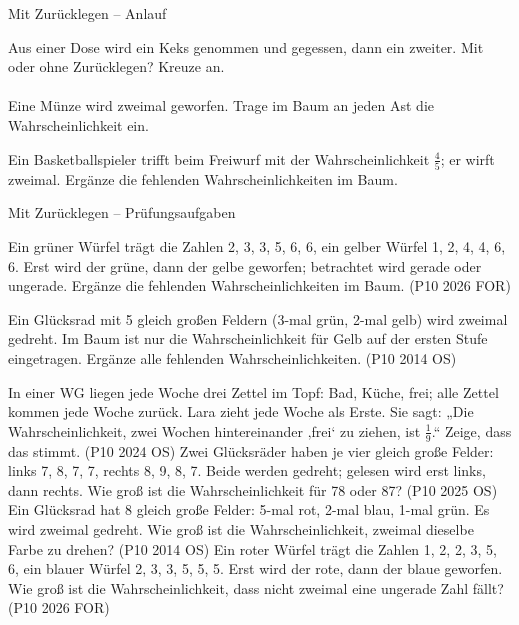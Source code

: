 \begin{aufgabe}{Mit Zurücklegen – Anlauf}
\begin{teile}
\teil Aus einer Dose wird ein Keks genommen und gegessen, dann ein zweiter. Mit oder ohne Zurücklegen? Kreuze an. \\  \\ 
\teil Eine Münze wird zweimal geworfen. Trage im Baum an jeden Ast die Wahrscheinlichkeit ein.

\teil Ein Basketballspieler trifft beim Freiwurf mit der Wahrscheinlichkeit $\frac{4}{5}$; er wirft zweimal. Ergänze die fehlenden Wahrscheinlichkeiten im Baum.

\end{teile}
\end{aufgabe}

\begin{aufgabe}{Mit Zurücklegen – Prüfungsaufgaben}
\begin{teile}
\teil Ein grüner Würfel trägt die Zahlen 2, 3, 3, 5, 6, 6, ein gelber Würfel 1, 2, 4, 4, 6, 6. Erst wird der grüne, dann der gelbe geworfen; betrachtet wird gerade oder ungerade. Ergänze die fehlenden Wahrscheinlichkeiten im Baum. \hfill (P10 2026 FOR)

\teil Ein Glücksrad mit 5 gleich großen Feldern (3-mal grün, 2-mal gelb) wird zweimal gedreht. Im Baum ist nur die Wahrscheinlichkeit für Gelb auf der ersten Stufe eingetragen. Ergänze alle fehlenden Wahrscheinlichkeiten. \hfill (P10 2014 OS)

\teil In einer WG liegen jede Woche drei Zettel im Topf: Bad, Küche, frei; alle Zettel kommen jede Woche zurück. Lara zieht jede Woche als Erste. Sie sagt: „Die Wahrscheinlichkeit, zwei Wochen hintereinander ‚frei‘ zu ziehen, ist $\frac{1}{9}$.“ Zeige, dass das stimmt. \hfill (P10 2024 OS)
\steil Zwei Glücksräder haben je vier gleich große Felder: links 7, 8, 7, 7, rechts 8, 9, 8, 7. Beide werden gedreht; gelesen wird erst links, dann rechts. Wie groß ist die Wahrscheinlichkeit für 78 oder 87? \hfill (P10 2025 OS)
\steil Ein Glücksrad hat 8 gleich große Felder: 5-mal rot, 2-mal blau, 1-mal grün. Es wird zweimal gedreht. Wie groß ist die Wahrscheinlichkeit, zweimal dieselbe Farbe zu drehen? \hfill (P10 2014 OS)
\teil Ein roter Würfel trägt die Zahlen 1, 2, 2, 3, 5, 6, ein blauer Würfel 2, 3, 3, 5, 5, 5. Erst wird der rote, dann der blaue geworfen. Wie groß ist die Wahrscheinlichkeit, dass nicht zweimal eine ungerade Zahl fällt? \hfill (P10 2026 FOR)
\end{teile}
\end{aufgabe}

